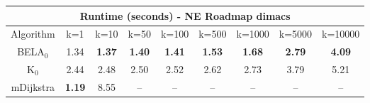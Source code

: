 \begin{tabular}{c|cccccccc}\toprule
\multicolumn{9}{c}{Runtime (seconds) - NE Roadmap dimacs}\\ \midrule
Algorithm & k=1 & k=10 & k=50 & k=100 & k=500 & k=1000 & k=5000 & k=10000 \\ \midrule
BELA$_0$ & 1.34 & \textbf{1.37} & \textbf{1.40} & \textbf{1.41} & \textbf{1.53} & \textbf{1.68} & \textbf{2.79} & \textbf{4.09} \\
K$_0$ & 2.44 & 2.48 & 2.50 & 2.52 & 2.62 & 2.73 & 3.79 & 5.21 \\
mDijkstra & \textbf{1.19} & 8.55 & -- & -- & -- & -- & -- & -- \\ \bottomrule 
\end{tabular}
